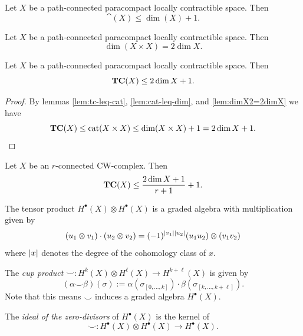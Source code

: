 \begin{lemma}\label{lem:cat-leq-dim}
    Let $X$ be a path-connected paracompact locally contractible space.
    Then
    \[
        \cat(X) \leq \dim(X) + 1.
    \]
\end{lemma}

\begin{lemma}\label{lem:dimX2=2dimX}
    Let $X$ be a path-connected paracompact locally contractible space.
    Then
    \[
        \dim(X \times X) = 2 \dim X.
    \]
\end{lemma}

\begin{theorem}
    Let $X$ be a path-connected paracompact locally contractible space.
    Then
    \[
        \operatorname{\mathbf{TC}}(X) \leq 2 \dim X + 1.
    \]
    \begin{proof}
        By lemmas \ref{lem:tc-leq-cat}, \ref{lem:cat-leq-dim}, and \ref{lem:dimX2=2dimX} we have
        \[
            \operatorname{\mathbf{TC}}(X)
            \leq \operatorname{cat}(X \times X)
            \leq \dim(X \times X) + 1
            = 2 \dim X + 1.
        \]
    \end{proof}
\end{theorem}

\begin{theorem}
    Let $X$ be an $r$-connected CW-complex.
    Then
    \[
        \operatorname{\mathbf{TC}}(X) \leq \frac{2 \dim X + 1}{r+1} + 1.
    \]
\end{theorem}

\begin{definition}
    The tensor product $H^\bullet(X) \otimes H^\bullet(X)$ is a graded algebra with multiplication given by
    \[
        (u_1 \otimes v_1) \cdot (u_2 \otimes v_2) = (-1)^{\left| v_1 \right| \left| u_2 \right|} (u_1 u_2) \otimes (v_1 v_2)
    \]
    where $\left| x \right|$ denotes the degree of the cohomology class of $x$.
\end{definition}

\begin{definition}
    The \emph{cup product} $\smile : H^k (X) \otimes H^\ell (X) \to H^{k + \ell} (X)$ is given by
    \[
        (\alpha \smile \beta)(\sigma) := \alpha(\sigma_{[0,...,k]}) \cdot \beta(\sigma_{[k,...,k+\ell]}).
    \]
    Note that this means $\smile$ induces a graded algebra $H^\bullet(X)$.
\end{definition}

\begin{definition}
    The \emph{ideal of the zero-divisors} of $H^\bullet(X)$ is the kernel of
    \[
        \smile : H^\bullet (X) \otimes H^\bullet (X) \to H^\bullet (X).
    \]
\end{definition}

